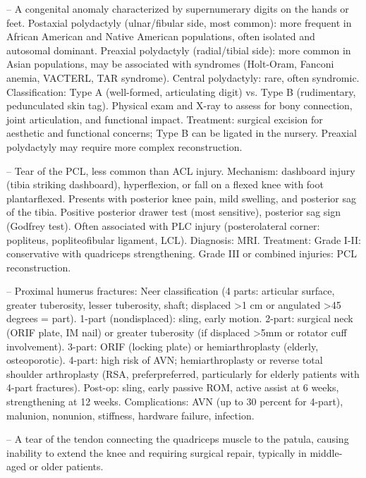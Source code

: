-- A congenital anomaly characterized by supernumerary digits on the hands or feet. Postaxial polydactyly (ulnar/fibular side, most common): more frequent in African American and Native American populations, often isolated and autosomal dominant. Preaxial polydactyly (radial/tibial side): more common in Asian populations, may be associated with syndromes (Holt-Oram, Fanconi anemia, VACTERL, TAR syndrome). Central polydactyly: rare, often syndromic. Classification: Type A (well-formed, articulating digit) vs. Type B (rudimentary, pedunculated skin tag). Physical exam and X-ray to assess for bony connection, joint articulation, and functional impact. Treatment: surgical excision for aesthetic and functional concerns; Type B can be ligated in the nursery. Preaxial polydactyly may require more complex reconstruction.

-- Tear of the PCL, less common than ACL injury. Mechanism: dashboard injury (tibia striking dashboard), hyperflexion, or fall on a flexed knee with foot plantarflexed. Presents with posterior knee pain, mild swelling, and posterior sag of the tibia. Positive posterior drawer test (most sensitive), posterior sag sign (Godfrey test). Often associated with PLC injury (posterolateral corner: popliteus, popliteofibular ligament, LCL). Diagnosis: MRI. Treatment: Grade I-II: conservative with quadriceps strengthening. Grade III or combined injuries: PCL reconstruction.

-- Proximal humerus fractures: Neer classification (4 parts: articular surface, greater tuberosity, lesser tuberosity, shaft; displaced >1 cm or angulated >45 degrees = part). 1-part (nondisplaced): sling, early motion. 2-part: surgical neck (ORIF plate, IM nail) or greater tuberosity (if displaced >5mm or rotator cuff involvement). 3-part: ORIF (locking plate) or hemiarthroplasty (elderly, osteoporotic). 4-part: high risk of AVN; hemiarthroplasty or reverse total shoulder arthroplasty (RSA, preferpreferred, particularly for elderly patients with 4-part fractures). Post-op: sling, early passive ROM, active assist at 6 weeks, strengthening at 12 weeks. Complications: AVN (up to 30 percent for 4-part), malunion, nonunion, stiffness, hardware failure, infection.

-- A tear of the tendon connecting the quadriceps muscle to the patula, causing inability to extend the knee and requiring surgical repair, typically in middle-aged or older patients.


